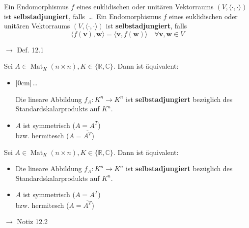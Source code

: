 \documentclass[11pt]{article}
\renewcommand{\cite}[1]{\par\bigskip\hfill{\color{gray}\tiny\(\to\) #1}}
\newcommand{\CC}{\mathbb{C}}
\newcommand{\RR}{\mathbb{R}}
\newcommand*{\scprod}[2]{\langle #1, #2\rangle} %
\renewcommand{\vec}[1]{\mathbf{#1}}
\DeclareMathOperator{\Mat}{Mat}
\newcommand{\hide}[1]{\parbox{0cm}{\raisebox{-7pt}[0cm]{\dots}}\color{white}#1\color{black}}
\let\olddots\dots
\renewcommand{\dots}{\,\olddots\,}
\newenvironment{field}{}{\newpage}
\newif\ifnote
\newenvironment{note}{\notetrue}{\notefalse}
\newcommand{\localtag}{}
\newcommand{\globaltag}{}
\newcommand{\uuid}{}
\newcommand{\tags}[1]{
    \ifnote
        \renewcommand{\localtag}{#1}
    \else
        \renewcommand{\globaltag}{#1}
    \fi
    }
\newcommand{\xplain}[1]{\renewcommand{\uuid}{#1}}
\begin{document}
\begin{note}
    \tags{Def}
    \xplain{f145cd78-c790-11ec-9d64-0242ac120002}

    \begin{field}
        Ein Endomorphismus $f$ eines euklidischen oder unitären Vektorraums $(V, \scprod{\cdot}{\cdot})$ ist \textbf{selbstadjungiert}, falls \dots
    \end{field}
    \begin{field}
        Ein Endomorphismus $f$ eines euklidischen oder unitären Vektorraums $(V, \scprod{\cdot}{\cdot})$ ist \textbf{selbstadjungiert}, falls
        \[\scprod{f(\vec{v})}{\vec{w}} = \scprod{\vec{v}}{f(\vec{w})} \quad \forall \vec{v,w}\in V\]
        \cite{Def. 12.1}
    \end{field}

    \begin{field}
        Sei $A\in \Mat_K(n\times n), K\in\{\RR,\CC\}$. Dann ist äquivalent:
        \begin{itemize}
            \item \hide{Die lineare Abbildung $f_A: K^n\longrightarrow K^n$ ist \textbf{selbstadjungiert} bezüglich des Standardskalarprodukts auf $K^n$.}
            \item $A$ ist symmetrisch ($A = A^T$) \\ bzw. hermitesch ($A = \overline{A^T}$)
        \end{itemize}
    \end{field}
    \begin{field}
        Sei $A\in \Mat_K(n\times n), K\in\{\RR,\CC\}$. Dann ist äquivalent:
        \begin{itemize}
            \item Die lineare Abbildung $f_A: K^n\longrightarrow K^n$ ist \textbf{selbstadjungiert} bezüglich des Standardskalarprodukts auf $K^n$.
            \item $A$ ist symmetrisch ($A = A^T$) \\ bzw. hermitesch ($A = \overline{A^T}$)
        \end{itemize}
        \cite{Notiz 12.2}
    \end{field}


\end{note}
\end{document}
